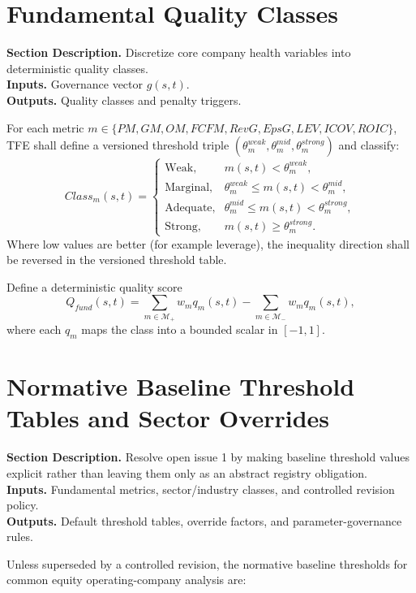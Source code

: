 \documentclass[11pt]{report}
\newcommand{\meta}[3]{\textbf{Section Description.} #1\\
\textbf{Inputs.} #2\\
\textbf{Outputs.} #3\par}
\begin{document}
\section{Fundamental Quality Classes}
\meta{Discretize core company health variables into deterministic quality classes.}{Governance vector $g(s,t)$.}{Quality classes and penalty triggers.}

For each metric $m\in\{PM,GM,OM,FCFM,RevG,EpsG,LEV,ICOV,ROIC\}$, TFE shall define a versioned threshold triple $(\theta_m^{weak},\theta_m^{mid},\theta_m^{strong})$ and classify:
\[
Class_m(s,t)=
\begin{cases}
\text{Weak}, & m(s,t) < \theta_m^{weak},\\
\text{Marginal}, & \theta_m^{weak}\le m(s,t)<\theta_m^{mid},\\
\text{Adequate}, & \theta_m^{mid}\le m(s,t)<\theta_m^{strong},\\
\text{Strong}, & m(s,t)\ge \theta_m^{strong}.
\end{cases}
\]
Where low values are better (for example leverage), the inequality direction shall be reversed in the versioned threshold table.

Define a deterministic quality score
\[
Q_{fund}(s,t)=\sum_{m\in\mathcal{M}_{+}} w_m q_m(s,t)-\sum_{m\in\mathcal{M}_{-}} w_m q_m(s,t),
\]
where each $q_m$ maps the class into a bounded scalar in $[-1,1]$.


\section{Normative Baseline Threshold Tables and Sector Overrides}
\meta{Resolve open issue 1 by making baseline threshold values explicit rather than leaving them only as an abstract registry obligation.}{Fundamental metrics, sector/industry classes, and controlled revision policy.}{Default threshold tables, override factors, and parameter-governance rules.}

Unless superseded by a controlled revision, the normative baseline thresholds for common equity operating-company analysis are:
\end{document}
